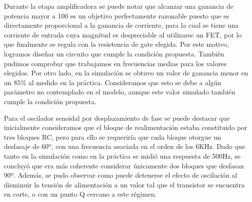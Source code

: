 \documentclass[a4paper, 10pt, spanish]{article}
\begin{document}
        Durante la etapa amplificadora se puede notar que alcanzar una ganancia de potencia mayor a 100 es un objetivo perfectamente razonable puesto que es directamente proporcional a la ganancia de corriente, para la cual se tiene una corriente de entrada cuya magnitud es despreciable al utilizarse un FET, por lo que finalmente se regula con la resistencia de gate elegida. Por este motivo, logramos diseñar un circuito que cumple la condición propuesta. También pudimos comprobar que trabajamos en frecuencias medias para los valores elegidos. Por otro lado, en la simulación se obtuvo un valor de ganancia menor en un $85\%$ al medido en la práctica. Consideramos que esto se debe a algún parámetro no contemplado en el modelo, aunque este valor simulado también cumple la condición propuesta.

        \medskip

        Para el oscilador senoidal por desplazamiento de fase se puede destacar que inicialmente consideramos que el bloque de realimentación estaba constituido por tres bloques RC, pero para ello se requeriría que cada bloque otorgue un desfasaje de 60º, con una frecuencia asociada en el orden de los 6KHz. Dado que tanto en la simulación como en la práctica se midió una respuesta de 500Hz, se concluyó que era más coherente considerar únicamente dos bloques que desfasan 90º. Además, se pudo observar como puede detenerse el efecto de oscilación al disminuir la tensión de alimentación a un valor tal que el transistor se encuentra en corte, o con un punto Q cercano a este régimen.






\end{document}

